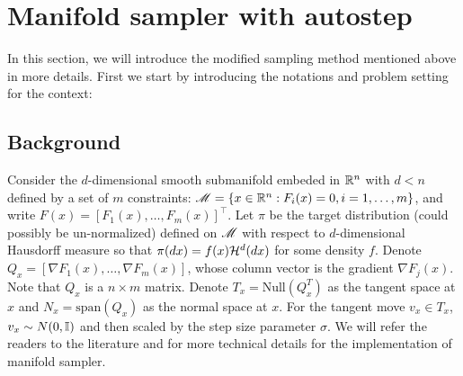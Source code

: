 \documentclass{article}
\begin{document}


\section{Manifold sampler with autostep}
In this section, we will introduce the modified sampling method mentioned above in more details. First we start by introducing the notations and problem setting for the context:
\subsection{Background}
Consider the $d$-dimensional smooth submanifold embeded in $\mathbb R^n$ with $d < n$ defined by a set of $m$ constraints: $\mathscr{M} = \{x \in \mathbb R^n : F_i(x) = 0, i = 1,\ldots, m\}$, and write $F(x) = [F_1(x),\ldots, F_m(x)]^\top$. Let $\pi$ be the target distribution (could possibly be un-normalized) defined on $\mathscr{M}$ with respect to $d$-dimensional Hausdorff measure so that $\pi(dx) = f(x) {\cal H}^{d}(dx)$ for some density $f$.
Denote $Q_x = [\nabla F_1(x), \ldots, \nabla F_m(x)]$, whose column vector is the gradient $\nabla F_j(x)$. Note that $Q_x$ is a $n \times m$ matrix. Denote $T_x = \text{Null}(Q_x^T)$ as the tangent space at $x$ and $N_x = \text{span}(Q_x)$ as the normal space at $x$. For the tangent move $v_x \in T_x$, $v_x \sim N(0, \mathbb I)$ and then scaled by the step size parameter $\sigma$. We will refer the readers to the literature \cite{manifoldparent} and \cite{manifoldchild} for more technical details for the implementation of manifold sampler.
\end{document}
